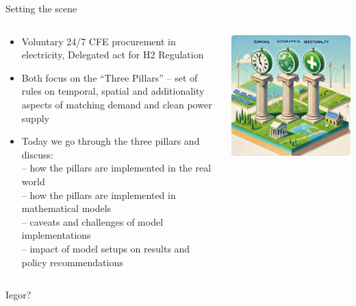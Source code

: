 \begin{frame}{Setting the scene}
  \begin{columns}
  	\begin{column}{0.7\textwidth}
  		 \begin{itemize}
  			\item Voluntary 24/7 CFE procurement in electricity, Delegated act for H2 Regulation
  			\item Both focus on the \enquote{Three Pillars} -- set of rules on temporal, spatial and additionality aspects of matching demand and clean power supply
  			\item Today we go through the \alert{three pillars} and discuss: \\
  			-- how the pillars are implemented in the real world \\
  			-- how the pillars are implemented in mathematical models \\
  			-- caveats and challenges of model implementations \\
  			-- impact of model setups on results and policy recommendations \\
  		\end{itemize}
  	\end{column}
  \begin{column}{0.3\textwidth}
  		\includegraphics[width=1\linewidth]{images/3pillars}  
  \end{column}
  \end{columns}
 

  Iegor?
  
\end{frame}

